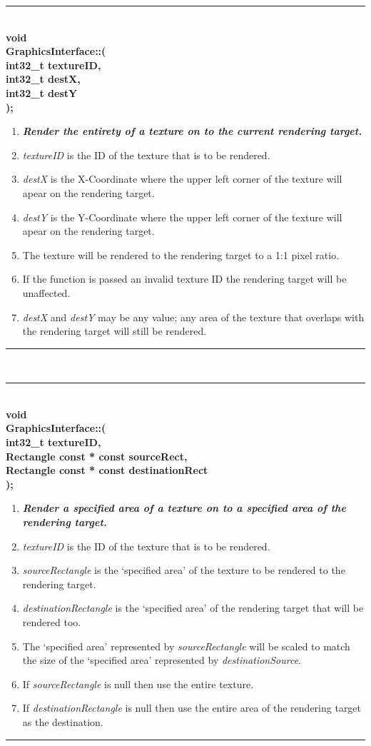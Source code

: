 \documentclass[12pt]{article}
\newcommand{\param}[1]{\indent\phantom{indent} \textbf{#1}\\ }
\newenvironment{func}[4]%
{%
	\noindent\ignorespaces
	\begin{minipage}[b]{\linewidth}
	\rule{\textwidth} {1pt} \\
	\textbf{#1\\#2::{\Large \color{blue}{#3}}(} \\
	\textbf{#4);} \\
	\noindent\ignorespaces
}%
{%
	\ignorespacesafterend
	\rule{\textwidth} {0.01pt} \\
	\end{minipage}
}
\begin{document}
\begin{func}{void}{GraphicsInterface}{basicRenderCopy}
{
	\param{int32\_t textureID,}
	\param{int32\_t destX,}
	\param{int32\_t destY}
}
\begin{enumerate}
\item[]\textit{\textbf{Render the entirety of a texture on to the current rendering target.}}
\item \textit{textureID} is the ID of the texture that is to be rendered.
\item \textit{destX} is the X-Coordinate where the upper left corner of the texture will apear on the rendering target.
\item \textit{destY} is the Y-Coordinate where the upper left corner of the texture will apear on the rendering target.
\item The texture will be rendered to the rendering target to a 1:1 pixel ratio.
\item If the function is passed an invalid texture ID the rendering target will be unaffected.
\item \textit{destX} and \textit{destY} may be any value; any area of the texture that overlaps with the rendering target will still be rendered.
\end{enumerate}
\end{func}

\begin{func}{void}{GraphicsInterface}{renderCopy}
{
	\param{int32\_t textureID,}
	\param{Rectangle const * const sourceRect,}
	\param{Rectangle const * const destinationRect}
}
\begin{enumerate}
\item[]\textit{\textbf{Render a specified area of a texture on to a specified area of the rendering target.}}
\item \textit{textureID} is the ID of the texture that is to be rendered.
\item \textit{sourceRectangle} is the `specified area' of the texture to be rendered to the rendering target.
\item \textit{destinationRectangle} is the `specified area' of the rendering target that will be rendered too.
\item The `specified area' represented by \textit{sourceRectangle} will be scaled to match the size of the `specified area' represented by \textit{destinationSource}.
\item If \textit{sourceRectangle} is null then use the entire texture. {\color{red}{(?-)}}
\item If \textit{destinationRectangle} is null then use the entire area of the rendering target as the destination. {\color{red}{(?)}}
\end{enumerate}
\end{func}
\end{document}
